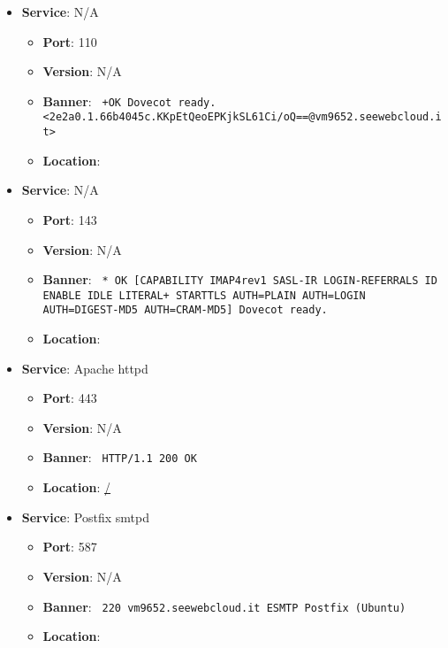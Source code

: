 \documentclass{article}
\begin{document}
\begin{itemize}
        \item \textbf{Service}: N/A
        \begin{itemize}
            \item \textbf{Port}: 110
            \item \textbf{Version}:  N/A 
            \item \textbf{Banner}: \texttt{
                +OK Dovecot ready. <2e2a0.1.66b4045c.KKpEtQeoEPKjkSL61Ci/oQ==@vm9652.seewebcloud.it>
            }
            \item \textbf{Location}: \href{  }{  }
        \end{itemize}
    
        \item \textbf{Service}: N/A
        \begin{itemize}
            \item \textbf{Port}: 143
            \item \textbf{Version}:  N/A 
            \item \textbf{Banner}: \texttt{
                * OK [CAPABILITY IMAP4rev1 SASL-IR LOGIN-REFERRALS ID ENABLE IDLE LITERAL+ STARTTLS AUTH=PLAIN AUTH=LOGIN AUTH=DIGEST-MD5 AUTH=CRAM-MD5] Dovecot ready.
            }
            \item \textbf{Location}: \href{  }{  }
        \end{itemize}
    
        \item \textbf{Service}: Apache httpd
        \begin{itemize}
            \item \textbf{Port}: 443
            \item \textbf{Version}:  N/A 
            \item \textbf{Banner}: \texttt{
                HTTP/1.1 200 OK
            }
            \item \textbf{Location}: \href{ / }{ / }
        \end{itemize}
    
        \item \textbf{Service}: Postfix smtpd
        \begin{itemize}
            \item \textbf{Port}: 587
            \item \textbf{Version}:  N/A 
            \item \textbf{Banner}: \texttt{
                220 vm9652.seewebcloud.it ESMTP Postfix (Ubuntu)
            }
            \item \textbf{Location}: \href{  }{  }
        \end{itemize}
    

\end{itemize}
\end{document}
